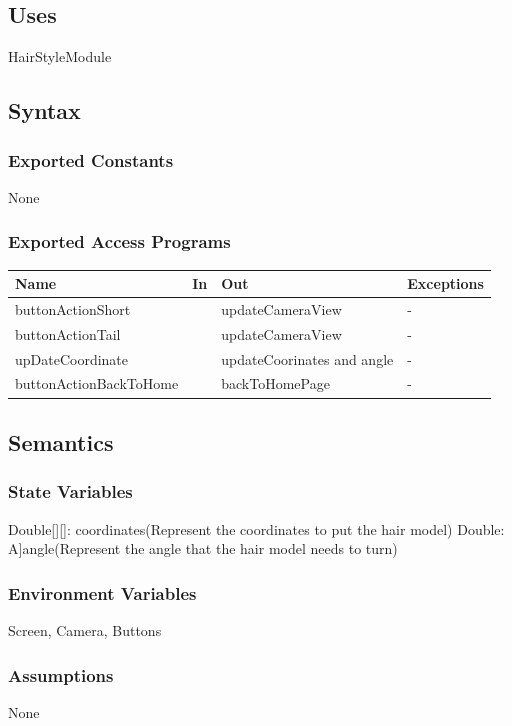 \documentclass[12pt, titlepage]{article}
\begin{document}
\subsection{Uses}
HairStyleModule 

\subsection{Syntax}
\subsubsection{Exported Constants}
None

\subsubsection{Exported Access Programs}
\begin{center}
\begin{tabular}{p{4cm} p{3cm} p{4cm} p{4cm}}
\hline
\textbf{Name} & \textbf{In} & \textbf{Out} & \textbf{Exceptions} \\
\hline
buttonActionShort &  & updateCameraView & - \\
buttonActionTail &  & updateCameraView & - \\
upDateCoordinate &  & updateCoorinates and angle & - \\
buttonActionBackToHome &  & backToHomePage & - \\
\hline
\end{tabular}
\end{center}

\subsection{Semantics}

\subsubsection{State Variables}
Double[][]: coordinates(Represent the coordinates to put the hair model)
Double: A]angle(Represent the angle that the hair model needs to turn)

\subsubsection{Environment Variables}
Screen, Camera, Buttons

\subsubsection{Assumptions}
None
\end{document}
